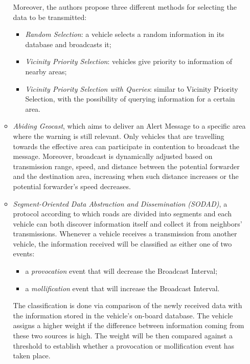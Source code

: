 \begin{enumerate}
\begin{itemize}
				Moreover, the authors propose three different methods for selecting the data to be transmitted:
				\begin{itemize}
					\item \textit{Random Selection}: a vehicle selects a random information in its database and broadcasts it;
					\item \textit{Vicinity Priority Selection}: vehicles give priority to information of nearby areas;
					\item \textit{Vicinity Priority Selection with Queries}: similar to Vicinity Priority Selection, with the possibility of querying information for a certain area.
				\end{itemize}
				
				\item \textit{Abiding Geocast}\cite{4531929}, which aims to deliver an Alert Message to a specific area where the warning is still relevant. Only vehicles that are travelling towards the effective area can participate in contention to broadcast the message. Moreover, broadcast is dynamically adjusted based on transmission range, speed, and distance between the potential forwarder and the destination area, increasing when such distance increases or the potential forwarder's speed decreases.
				
				\item \textit{Segment-Oriented Data Abstraction and Dissemination
					(SODAD)}\cite{1402433}, a protocol according to which roads are divided into segments and each vehicle can both discover information itself and collect it from neighbors' transmissions. Whenever a vehicle receives a transmission from another vehicle, the information received will be classified as either one of two events:
				\begin{itemize}
					\item a \textit{provocation} event that will decrease the Broadcast Interval;
					\item a \textit{mollification} event that will increase the Broadcast Interval.
				\end{itemize}
				The classification is done via comparison of the newly received data with the information stored in the vehicle's on-board database. The vehicle assigns a higher weight if the difference between information coming from these two sources is high. The weight will be then compared against a threshold to establish whether a provocation or mollification event has taken place.
			\end{itemize}
		\end{enumerate}
		
